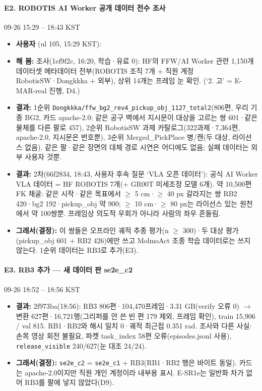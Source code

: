 \paragraph{E2. ROBOTIS AI Worker 공개 데이터 전수 조사}
{\small 09-26 15:29 -- 18:43 KST}
\begin{itemize}
  \item \textbf{사용자} (ul 105, 15:29 KST): 
  \item \textbf{해 봄:} 조사(1ef9f2c, 16:20, 학습·유료 0): HF의 FFW/AI Worker 관련 1,150개 데이터셋 메타데이터 전부(ROBOTIS 조직 7개 + 직원 계정 RobotisSW·Dongkkka + 외부), 상위 14개는 프레임 눈 확인. (`2. 고' = E-MAR-real 진행, D4.)
  \item \textbf{결과:} 1순위 \texttt{Dongkkka/\allowbreak{}ffw\_\allowbreak{}bg2\_\allowbreak{}rev4\_\allowbreak{}pickup\_\allowbreak{}obj\_\allowbreak{}1127\_\allowbreak{}total2}(806편, 우리 기종 BG2, 카드 apache-2.0; 같은 공구 벽에서 지시문이 대상을 고르는 쌍 601·같은 물체를 다른 팔로 457), 2순위 RobotisSW 과제 카탈로그(322과제·7,364편, apache-2.0, 지시문은 번호뿐), 3순위 Merged\_PickPlace 병/캔(두 대상, 라이선스 없음). 같은 팔·같은 장면의 대체 경로 시연은 어디에도 없음; 실패 데이터는 외부 사용자 것뿐.
  \item \textbf{결과:} 2차(66f2834, 18:43, 사용자 후속 질문 `VLA 오픈 데이터'): 공식 AI Worker VLA 데이터 = HF ROBOTIS 7개(+ GR00T 미세조정 모델 6개). 약 10,500편 FK 채굴: 같은 시작·같은 목표에서 $\geq$ 5 cm·$\geq$ 40 px 갈라지는 쌍 RB2 420·bg2 192·pickup\_obj 약 900; $\geq$ 10 cm·$\geq$ 80 px는 라이선스 있는 원천에서 약 100쌍뿐. 프레임상 의도적 우회가 아니라 사람의 좌우 흔들림.
  \item \textbf{그래서(결정):} 이 쌍들은 오프라인 궤적 추종 평가(n $\geq$ 300)·두 대상 평가(pickup\_obj 601 + RB2 426)에만 쓰고 MolmoAct 조종 학습 데이터로는 쓰지 않는다. 1순위 데이터는 RB3로 추가(E3).
\end{itemize}

\paragraph{E3. RB3 추가 --- 새 데이터 판 se2e\_c2}
{\small 09-26 18:52 -- 18:56 KST}
\begin{itemize}
  \item \textbf{결과:} 2f973ba(18:56): RB3 806편·104,470프레임·3.31 GB(verify 오류 0) $\rightarrow$ 변환 627편·16,721행(그리퍼를 안 쓴 빈 편 179 제외, 프레임 확인), train 15,906 / val 815. RB1·RB2와 해시 일치 0·궤적 최근접 0.351 rad. 조사와 다른 사실: 손목 영상 회전 불필요, 파켓 task\_index 58편 오류(episodes.jsonl 사용), \texttt{release\_\allowbreak{}visible} 240/627(눈 대조 24/24).
  \item \textbf{그래서(결정):} \texttt{se2e\_\allowbreak{}c2} = \texttt{se2e\_\allowbreak{}c1} + RB3(RB1·RB2 행은 바이트 동일). 카드는 apache-2.0이지만 직원 개인 계정이라 내부용 표시. E-SR1e는 일반화 차가 없어 RB3를 팔에 넣지 않았다(D9).
\end{itemize}

